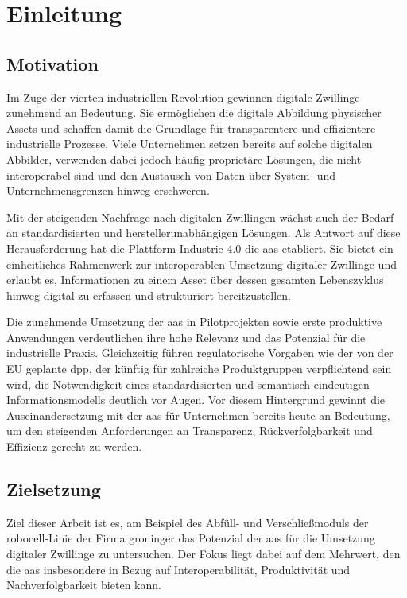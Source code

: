 \thispagestyle{fancy}
\section{Einleitung}
\subsection{Motivation}
\label{sec:Motivation}
Im Zuge der vierten industriellen Revolution gewinnen digitale Zwillinge zunehmend an Bedeutung. 
Sie ermöglichen die digitale Abbildung physischer Assets und schaffen damit die Grundlage für transparentere und effizientere industrielle Prozesse. 
Viele Unternehmen setzen bereits auf solche digitalen Abbilder, verwenden dabei jedoch häufig proprietäre Lösungen, die nicht interoperabel sind und den Austausch von Daten über System- und Unternehmensgrenzen hinweg erschweren.

Mit der steigenden Nachfrage nach digitalen Zwillingen wächst auch der Bedarf an standardisierten und herstellerunabhängigen Lösungen. 
Als Antwort auf diese Herausforderung hat die Plattform Industrie 4.0 die \acs{aas} etabliert. 
Sie bietet ein einheitliches Rahmenwerk zur interoperablen Umsetzung digitaler Zwillinge und erlaubt es, Informationen zu einem Asset über dessen gesamten Lebenszyklus hinweg digital zu erfassen und strukturiert bereitzustellen.

Die zunehmende Umsetzung der \acs{aas} in Pilotprojekten sowie erste produktive Anwendungen verdeutlichen ihre hohe Relevanz und das Potenzial für die industrielle Praxis. 
Gleichzeitig führen regulatorische Vorgaben wie der von der EU geplante \acs{dpp}, der künftig für zahlreiche Produktgruppen verpflichtend sein wird, die Notwendigkeit eines standardisierten und semantisch eindeutigen Informationsmodells deutlich vor Augen.
Vor diesem Hintergrund gewinnt die Auseinandersetzung mit der \acs{aas} für Unternehmen bereits heute an Bedeutung, um den steigenden Anforderungen an Transparenz, Rückverfolgbarkeit und Effizienz gerecht zu werden.

\subsection{Zielsetzung}

Ziel dieser Arbeit ist es, am Beispiel des Abfüll- und Verschließmoduls der robocell-Linie der Firma groninger das Potenzial der \acs{aas} für die Umsetzung digitaler Zwillinge zu untersuchen. 
Der Fokus liegt dabei auf dem Mehrwert, den die \acs{aas} insbesondere in Bezug auf Interoperabilität, Produktivität und Nachverfolgbarkeit bieten kann. 

